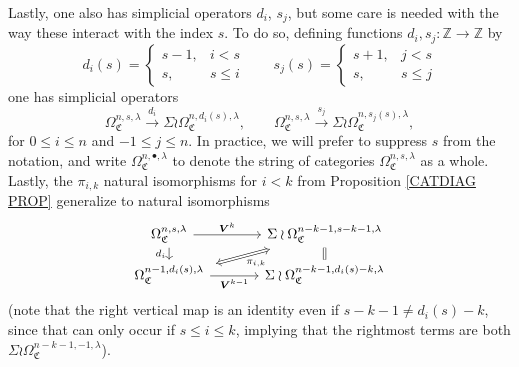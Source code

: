 \documentclass[a4paper,10pt
]{article}%
\numberwithin{equation}{section}
\numberwithin{figure}{section}
\theoremstyle{definition} %
\newcommand{\1}{\ensuremath{\mathbbm 1}}%
\begin{document}
Lastly, one also has simplicial operators $d_i$, $s_j$, 
but some care is needed with the way these interact with the index $s$. To do so, defining functions $d_i,s_j\colon \mathbb{Z} \to \mathbb{Z}$ by
\begin{equation}\label{SIMPLEXP EQ}
d_i(s) = 
\begin{cases}
s-1, & i<s
\\
s, & s\leq i
\end{cases}
\qquad
s_j(s) = 
\begin{cases}
s+1, & j<s
\\
s, & s\leq j
\end{cases}
\end{equation}
one has simplicial operators
\[
\Omega_{\mathfrak{C}}^{n,s,\lambda} \xrightarrow{d_i} \Sigma \wr\Omega_{\mathfrak{C}}^{n,d_i(s),\lambda},
\qquad
\Omega_{\mathfrak{C}}^{n,s,\lambda} \xrightarrow{s_j} \Sigma \wr\Omega_{\mathfrak{C}}^{n,s_j(s),\lambda},
\]
for $0\leq i \leq n$ and $-1\leq j \leq n$.
In practice, we will prefer to suppress $s$ from the notation,
and write 
$\Omega_{\mathfrak{C}}^{n,\bullet,\lambda}$ to denote the string of categories 
$\Omega_{\mathfrak{C}}^{n,s,\lambda}$ as a whole.
Lastly, the $\pi_{i,k}$ natural isomorphisms for $i<k$ from Proposition \ref{CATDIAG PROP}
generalize to natural isomorphisms
\begin{equation}
\begin{tikzcd}[row sep = tiny, column sep = 35pt]
\Omega_{\mathfrak{C}}^{n,s,\lambda}
\arrow{r}{\boldsymbol{V}^k} \arrow{dd}[swap]{d_i} &
|[alias=U]|
\Sigma \wr \Omega_{\mathfrak{C}}^{n-k-1,s-k-1,\lambda}
\ar[equal]{dd}{}
\\
\\
|[alias=V]|
\Omega_{\mathfrak{C}}^{n-1,d_i(s),\lambda} \arrow{r}[swap]{\boldsymbol{V}^{k-1}} &
\Sigma \wr \Omega_{\mathfrak{C}}^{n-k-1,d_i(s)-k,\lambda}
\arrow[Leftrightarrow, from=V, to=U,shorten >=0.15cm,shorten <=0.15cm
,swap,"\pi_{i,k}"
]
\end{tikzcd}
\end{equation}
(note that the right vertical map is an identity even if
$s-k-1 \neq d_i(s)-k$, since that can only occur if $s\leq i \leq k$, implying that the rightmost terms are both $\Sigma \wr \Omega_{\mathfrak{C}}^{n-k-1,-1,\lambda}$).
\end{document}
